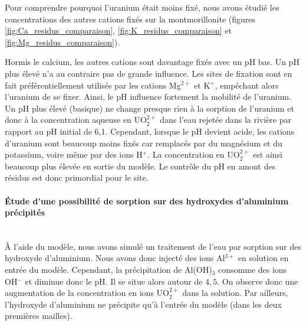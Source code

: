 \documentclass{article}
\begin{document}
Pour comprendre pourquoi l’uranium était moins fixé, nous avons étudié les concentrations des autres cations fixés sur la montmorillonite (figures \ref{fig:Ca_residus_comparaison}, \ref{fig:K_residus_comparaison} et \ref{fig:Mg_residus_comparaison}).

Hormis le calcium, les autres cations sont davantage fixés avec un pH bas. Un pH plus élevé n'a au contraire pas de grande influence. Les sites de fixation sont en fait préférentiellement utilisés par les cations Mg$^{2+}$ et K$^{+}$, empêchant alors l’uranium de se fixer.
Ainsi, le pH influence fortement la mobilité de l’uranium. Un pH plus élevé (basique) ne change presque rien à la sorption de l’uranium et donc à la concentration aqueuse en UO$_2^{2+}$ dans l’eau rejetée dans la rivière par rapport au pH initial de 6,1. Cependant, lorsque le pH devient acide, les cations d’uranium sont beaucoup moins fixés car remplacés par du magnésium et du potassium, voire même par des ions H$^{+}$. La concentration en UO$_2^{2+}$ est ainsi beaucoup plus élevée en sortie du modèle. Le contrôle du pH en amont des résidus est donc primordial pour le site.

\paragraph{Étude d'une possibilité de sorption sur des hydroxydes d'aluminium précipités \\ \\}
À l'aide du modèle, nous avons simulé un traitement de l’eau par sorption sur des hydroxyde d’aluminium. Nous avons donc injecté des ions Al$^{3+}$ en solution en entrée du modèle. Cependant, la précipitation de Al(OH)$_3$ consomme des ions OH$^{-}$ et diminue donc le pH. Il se situe alors autour de $4,5$. On observe donc une augmentation de la concentration en ions UO$_2^{2+}$ dans la solution. Par ailleurs, l’hydroxyde d’aluminium ne précipite qu'à l’entrée du modèle (dans les deux premières mailles).
\end{document}
